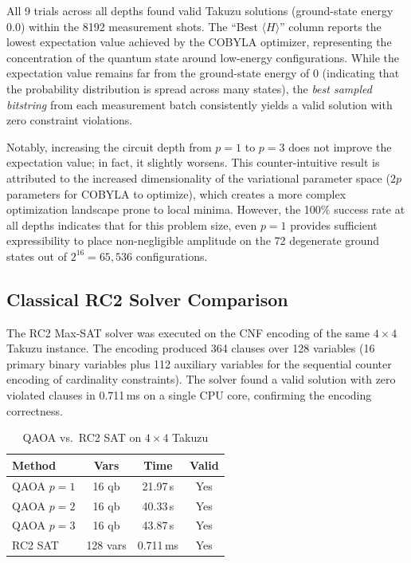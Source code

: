\documentclass[eng]{ajceam-class}
\begin{document}
All 9 trials across all depths found valid Takuzu solutions (ground-state energy 0.0) within the 8192 measurement shots. The ``Best $\langle H \rangle$'' column reports the lowest expectation value achieved by the COBYLA optimizer, representing the concentration of the quantum state around low-energy configurations. While the expectation value remains far from the ground-state energy of 0 (indicating that the probability distribution is spread across many states), the \emph{best sampled bitstring} from each measurement batch consistently yields a valid solution with zero constraint violations.

Notably, increasing the circuit depth from $p=1$ to $p=3$ does not improve the expectation value; in fact, it slightly worsens. This counter-intuitive result is attributed to the increased dimensionality of the variational parameter space ($2p$ parameters for COBYLA to optimize), which creates a more complex optimization landscape prone to local minima. However, the 100\% success rate at all depths indicates that for this problem size, even $p=1$ provides sufficient expressibility to place non-negligible amplitude on the 72 degenerate ground states out of $2^{16} = 65{,}536$ configurations.

\subsection{Classical RC2 Solver Comparison}

The RC2 Max-SAT solver was executed on the CNF encoding of the same $4 \times 4$ Takuzu instance. The encoding produced 364 clauses over 128 variables (16 primary binary variables plus 112 auxiliary variables for the sequential counter encoding of cardinality constraints). The solver found a valid solution with zero violated clauses in 0.711\,ms on a single CPU core, confirming the encoding correctness.

\begin{table}[h]
\centering
\caption{QAOA vs.\ RC2 SAT on $4 \times 4$ Takuzu}
\footnotesize
\begin{tabular}{|l|c|c|c|}
\hline
\textbf{Method} & \textbf{Vars} & \textbf{Time} & \textbf{Valid} \\
\hline
QAOA $p\!=\!1$ & 16 qb & 21.97\,s & Yes \\
QAOA $p\!=\!2$ & 16 qb & 40.33\,s & Yes \\
QAOA $p\!=\!3$ & 16 qb & 43.87\,s & Yes \\
RC2 SAT & 128 vars & 0.711\,ms & Yes \\
\hline
\end{tabular}
\label{tab:comparison}
\end{table}
\end{document}
